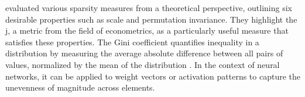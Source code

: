 \citet{hurley2009gini} evaluated various sparsity measures from a theoretical perspective, outlining six desirable properties such as scale and permutation invariance. They highlight the j, a metric from the field of econometrics, as a particularly useful measure that satisfies these properties. The Gini coefficient quantifies inequality in a distribution by measuring the average absolute difference between all pairs of values, normalized by the mean of the distribution \citep{hurley2009gini}. In the context of neural networks, it can be applied to weight vectors or activation patterns to capture the unevenness of magnitude across elements.
 





